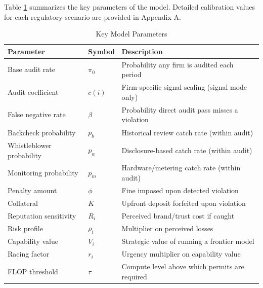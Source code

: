 Table \ref{tab:parameters} summarizes the key parameters of the model. Detailed calibration values for each regulatory scenario are provided in Appendix A.

\begin{table}[h]
\centering
\caption{Key Model Parameters}
\label{tab:parameters}
\begin{tabular}{@{}llp{7cm}@{}}
\toprule
\textbf{Parameter} & \textbf{Symbol} & \textbf{Description} \\
\midrule
Base audit rate & $\pi_0$ & Probability any firm is audited each period \\
Audit coefficient & $c(i)$ & Firm-specific signal scaling (signal mode only) \\
False negative rate & $\beta$ & Probability direct audit pass misses a violation \\
Backcheck probability & $p_b$ & Historical review catch rate (within audit) \\
Whistleblower probability & $p_w$ & Disclosure-based catch rate (within audit) \\
Monitoring probability & $p_m$ & Hardware/metering catch rate (within audit) \\
Penalty amount & $\phi$ & Fine imposed upon detected violation \\
Collateral & $K$ & Upfront deposit forfeited upon violation \\
Reputation sensitivity & $R_i$ & Perceived brand/trust cost if caught \\
Risk profile & $\rho_i$ & Multiplier on perceived losses \\
Capability value & $V_i$ & Strategic value of running a frontier model \\
Racing factor & $r_i$ & Urgency multiplier on capability value \\
FLOP threshold & $\tau$ & Compute level above which permits are required \\
\bottomrule
\end{tabular}
\end{table}